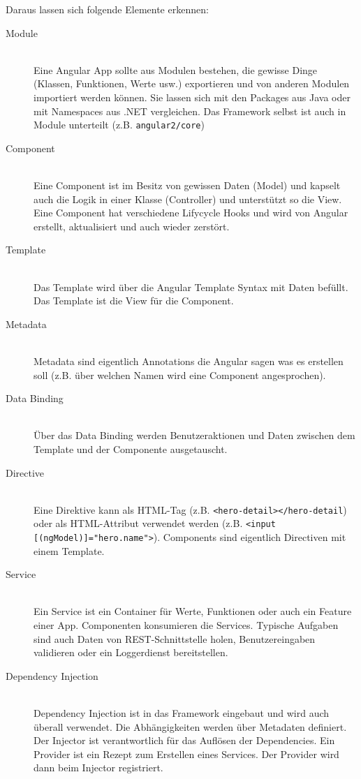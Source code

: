 \newpage

Daraus lassen sich folgende Elemente erkennen:
\begin{description}
	\item[Module] \hfil \\
	Eine Angular App sollte aus Modulen bestehen, die gewisse Dinge (Klassen, Funktionen, Werte usw.) exportieren und von anderen Modulen importiert werden können. Sie lassen sich mit den Packages aus Java oder mit Namespaces aus .NET vergleichen. Das Framework selbst ist auch in Module unterteilt (z.B. \lstinline|angular2/core|)
	\item[Component] \hfil \\
	Eine Component ist im Besitz von gewissen Daten (Model) und kapselt auch die Logik in einer Klasse (Controller) und unterstützt so die View. Eine Component hat verschiedene Lifycycle Hooks und wird von Angular erstellt, aktualisiert und auch wieder zerstört.
	\item[Template] \hfil \\
	Das Template wird über die Angular Template Syntax mit Daten befüllt. Das Template ist die View für die Component.
	\item[Metadata] \hfil \\
	Metadata sind eigentlich Annotations die Angular sagen was es erstellen soll (z.B. über welchen Namen wird eine Component angesprochen).
	\item[Data Binding] \hfil \\
	Über das Data Binding werden Benutzeraktionen und Daten zwischen dem Template und der Componente ausgetauscht. 
	\item[Directive] \hfil \\
	Eine Direktive kann als HTML-Tag (z.B. \lstinline|<hero-detail></hero-detail|) oder als HTML-Attribut verwendet werden (z.B. \lstinline|<input [(ngModel)]="hero.name">|). Components sind eigentlich Directiven mit einem Template.
	\item[Service] \hfil \\
	Ein Service ist ein Container für Werte, Funktionen oder auch ein Feature einer App. Componenten konsumieren die Services. Typische Aufgaben sind auch Daten von REST-Schnittstelle holen, Benutzereingaben validieren oder ein Loggerdienst bereitstellen.
	\item[Dependency Injection] \hfil \\
	Dependency Injection ist in das Framework eingebaut und wird auch überall verwendet. Die Abhängigkeiten werden über Metadaten definiert. Der Injector ist verantwortlich für das Auflösen der Dependencies. Ein Provider ist ein Rezept zum Erstellen eines Services. Der Provider wird dann beim Injector registriert.
\end{description}
